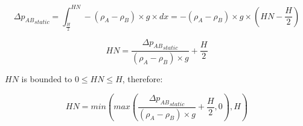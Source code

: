\documentclass[a4paper, french]{article}
\begin{document}
            \begin{equation*}
                \Delta {p_{AB}}_{static} = \int_{\frac{H}{2}}^{HN} -(\rho_A - \rho_B) \times g \times dx = -(\rho_A - \rho_B) \times g \times (HN - \frac{H}{2})
            \end{equation*}

            \begin{equation}
                HN = \frac{ \Delta {p_{AB}}_{static} }{ (\rho_A - \rho_B) \times g } + \frac{H}{2}
            \end{equation}
            
            $HN$ is bounded to $ 0 \leq HN \leq H$, therefore:
            
            \begin{equation}
                HN = min \left( max \left( \frac{ \Delta {p_{AB}}_{static} }{ (\rho_A - \rho_B) \times g } + \frac{H}{2}, 0\right), H \right)
            \end{equation}            
            
        
    
\end{document}
